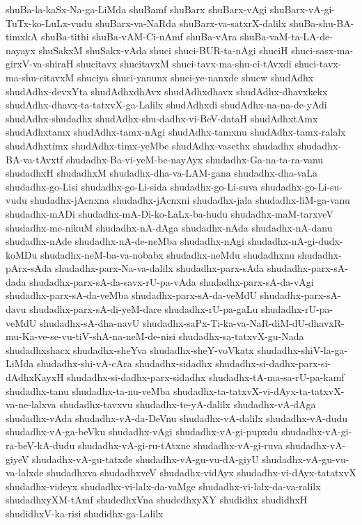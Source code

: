 {shuBa-la-kaSx-Na-ga-LiMda
shuBamf
shuBarx
shuBarx-vAgi
shuBarx-vA-gi-TuTx-ko-LuLx-vudu
shuBarx-va-NaRda
shuBarx-va-satxrX-dalilx
shuBa-shu-BA-timxkA
shuBa-tithi
shuBa-vAM-Ci-nAmf
shuBa-vAra
shuBa-vaM-ta-LA-de-nayayx
shuSakxM
shuSakx-vAda
shuci
shuci-BUR-ta-nAgi
shuciH
shuci-sasx-ma-girxV-va-shiraH
shucitavx
shucitavxM
shuci-tavx-ma-shu-ci-tAvxdi
shuci-tavx-ma-shu-citavxM
shuciya
shuci-yanunx
shuci-ye-nanxde
shucw
shudAdhx
shudAdhx-devxYta
shudAdhxdhAvx
shudAdhxdhavx
shudAdhx-dhavxkekx
shudAdhx-dhavx-ta-tatxvX-ga-Lalilx
shudAdhxdi
shudAdhx-na-na-de-yAdi
shudAdhx-shudadhx
shudAdhx-shu-dadhx-vi-BeV-dataH
shudAdhxtAmx
shudAdhxtamx
shudAdhx-tamx-nAgi
shudAdhx-tamxnu
shudAdhx-tamx-ralalx
shudAdhxtimx
shudAdhx-timx-yeMbe
shudAdhx-vasethx
shudadhx
shudadhx-BA-va-tAvxtf
shudadhx-Ba-vi-yeM-be-nayAyx
shudadhx-Ga-na-ta-ra-vanu
shudadhxH
shudadhxM
shudadhx-dha-va-LAM-gana
shudadhx-dha-vaLa
shudadhx-go-Lisi
shudadhx-go-Li-sida
shudadhx-go-Li-suva
shudadhx-go-Li-su-vudu
shudadhx-jAcnxna
shudadhx-jAcnxni
shudadhx-jala
shudadhx-liM-ga-vanu
shudadhx-mADi
shudadhx-mA-Di-ko-LaLx-ba-hudu
shudadhx-maM-tarxveV
shudadhx-me-nikuM
shudadhx-nA-dAga
shudadhx-nAda
shudadhx-nA-danu
shudadhx-nAde
shudadhx-nA-de-neMba
shudadhx-nAgi
shudadhx-nA-gi-dudx-koMDu
shudadhx-neM-ba-va-nobabx
shudadhx-neMdu
shudadhxnu
shudadhx-pArx-sAda
shudadhx-parx-Na-va-dalilx
shudadhx-parx-sAda
shudadhx-parx-sA-dada
shudadhx-parx-sA-da-savx-rU-pa-vAda
shudadhx-parx-sA-da-vAgi
shudadhx-parx-sA-da-veMba
shudadhx-parx-sA-da-veMdU
shudadhx-parx-sA-davu
shudadhx-parx-sA-di-yeM-dare
shudadhx-rU-pa-gaLu
shudadhx-rU-pa-veMdU
shudadhx-sA-dha-navU
shudadhx-saPx-Ti-ka-va-NaR-diM-dU-dhavxR-mu-Ka-ve-se-vu-tiV-shA-na-neM-de-nisi
shudadhx-sa-tatxvX-gu-Nada
shudadhxshacx
shudadhx-sheYva
shudadhx-sheY-voVkatx
shudadhx-shiV-la-ga-LiMda
shudadhx-shi-vA-cAra
shudadhx-sidadhx
shudadhx-si-dadhx-parx-si-dAdhxKayxH
shudadhx-si-dadhx-parx-sidadhx
shudadhx-tA-ma-sa-rU-pa-kamf
shudadhx-tanu
shudadhx-ta-nu-veMba
shudadhx-ta-tatxvX-vi-dAyx-ta-tatxvX-va-ne-lalxva
shudadhx-tavxvu
shudadhx-te-yA-dalilx
shudadhx-vA-dAga
shudadhx-vAda
shudadhx-vA-da-DeVnu
shudadhx-vA-dalilx
shudadhx-vA-dudu
shudadhx-vA-ga-beVku
shudadhx-vAgi
shudadhx-vA-gi-pupxdu
shudadhx-vA-gi-ra-beV-kA-dudu
shudadhx-vA-gi-ru-tAtxne
shudadhx-vA-gi-ruva
shudadhx-vA-giyeV
shudadhx-vA-gu-tatxde
shudadhx-vA-gu-vu-dA-giyU
shudadhx-vA-gu-vu-va-lalxde
shudadhxva
shudadhxveV
shudadhx-vidAyx
shudadhx-vi-dAyx-tatatxvX
shudadhx-videyx
shudadhx-vi-lalx-da-vaMge
shudadhx-vi-lalx-da-va-ralilx
shudadhxyXM-tAmf
shudedhxVna
shudedhxyXY
shudidhx
shudidhxH
shudidhxV-ka-risi
shudidhx-ga-Lalilx
}
